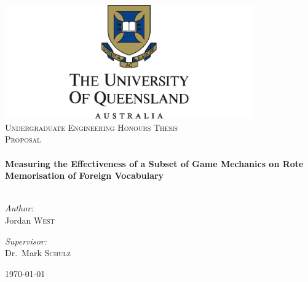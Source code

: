 \begin{titlepage}

\begin{center}


\includegraphics[width=0.8\textwidth]{./uqlogo.jpg}\\[1cm]    

\textsc{\Large Undergraduate Engineering Honours Thesis}\\[0.5cm]

\textsc{\LARGE Proposal}\\[0.5cm]


\HRule \\[0.4cm]
{ \Large \bfseries Measuring the Effectiveness of a Subset of Game Mechanics on Rote Memorisation of Foreign Vocabulary}\\[0.4cm]

\HRule \\[1.5cm]

\begin{minipage}{0.4\textwidth}
\begin{flushleft} \large
\emph{Author:}\\
Jordan \textsc{West}
\end{flushleft}
\end{minipage}
\begin{minipage}{0.4\textwidth}
\begin{flushright} \large
\emph{Supervisor:} \\
Dr.~Mark \textsc{Schulz}
\end{flushright}
\end{minipage}

\vfill

{\large \today}

\end{center}

\end{titlepage}
